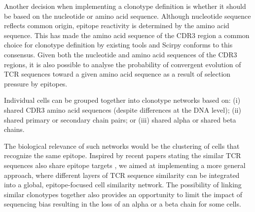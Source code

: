 \documentclass{article}
\begin{document}
Another decision when implementing a clonotype definition is whether it should be based on the nucleotide or amino acid sequence. Although nucleotide sequence reflects common origin, epitope reactivity is determined by the amino acid sequence. This has made the amino acid sequence of the CDR3 region a common choice for clonotype definition by existing tools and Scirpy conforms to this consensus. Given both the nucleotide and amino acid sequences of the CDR3 regions, it is also possible to analyse the probability of convergent evolution of TCR sequences toward a given amino acid sequence as a result of selection pressure by epitopes.
\par

Individual cells can be grouped together into clonotype networks based on:\newline
\hspace*{2\parindent}(i) shared CDR3 amino acid sequences (despite differences at the DNA level);\newline
\hspace*{2\parindent}(ii) shared primary or secondary chain pairs;\newline
\hspace*{2\parindent}or (iii)  shared alpha or shared beta chains.\par

The biological relevance of such networks would be the clustering of cells that recognize the same epitope. Inspired by recent papers stating the similar TCR sequences also share epitope targets \cite{Glanville2017-ay, Dash2017-xt, Fischer_undated-cx}, we aimed at implementing a more general approach, where different layers of TCR sequence similarity can be integrated into a global, epitope-focused cell similarity network. The possibility of linking similar clonotypes together also provides an opportunity to limit the impact of  sequencing bias resulting in the loss of an alpha or a beta chain for some cells.\par

\newpage
\end{document}
